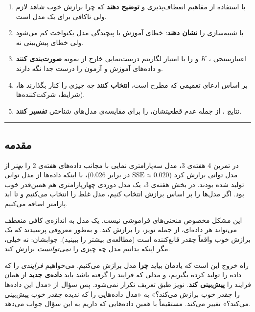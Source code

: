 \begin{enumerate}
\def\labelenumi{\arabic{enumi}.}
\tightlist
\item
  با استفاده از مفاهیم انعطاف‌پذیری و  \textbf{توضیح
  دهند} که چرا برازش خوب شاهد لازم ولی ناکافی برای یک مدل است.
\item
  با شبیه‌سازی  را \textbf{نشان دهند}: خطای آموزش با
  پیچیدگی مدل یکنواخت کم می‌شود ولی خطای پیش‌بینی نه.
\item
  اعتبارسنجی ، \(K\) و  را با
  امتیاز لگاریتم درست‌نمایی خارج از نمونه \textbf{صورت‌بندی کنند} و
  داده‌های آموزش و آزمون را درست جدا نگه دارند.
\item
  بر اساس ادعای تعمیمی که مطرح است، \textbf{انتخاب کنند} چه چیزی را کنار
  بگذارند ها، شرایط، شرکت‌کننده‌ها).
\item
  نتایج ، از جمله عدم قطعیتشان، را برای مقایسه‌ی
  مدل‌های شناختی \textbf{تفسیر کنند}.
\end{enumerate}

\begin{center}\rule{0.5\linewidth}{0.5pt}\end{center}

\subsection{مقدمه}

در تمرین 4 هفته‌ی 3، مدل سه‌پارامتری نمایی با مجانب داده‌های هفته‌ی 2 را
\emph{بهتر} از مدل توانی برازش کرد (\(\mathrm{SSE} \approx 0.020\) در
برابر \(0.026\))، با اینکه داده‌ها از مدل توانی تولید شده بودند. در بخش
 هفته‌ی 3، یک مدل دوردی چهارپارامتری هم همین‌قدر خوب بود. اگر مدل‌ها
را بر اساس برازش انتخاب کنیم، مدل غلط را انتخاب می‌کنیم و تا ابد پارامتر
اضافه می‌کنیم.

این مشکل مخصوص منحنی‌های فراموشی نیست. یک مدل به اندازه‌ی کافی منعطف
می‌تواند هر داده‌ای، از جمله نویز، را برازش کند.  و
 به‌طور معروفی پرسیدند که یک برازش خوب واقعاً چقدر قانع‌کننده
است (مطالعه‌ی بیشتر را ببینید). جوابشان: نه خیلی، مگر اینکه بدانیم مدل چه
چیزی را \emph{نمی‌توانست} برازش کند.

راه خروج این است که یادمان بیاید \textbf{چرا} مدل برازش می‌کنیم. می‌خواهیم
\emph{فرایندی} را که داده را تولید کرده بگیریم، و مدلی که فرایند را
گرفته باشد باید \textbf{داده‌ی جدید} از همان فرایند را \textbf{پیش‌بینی
کند}. نویز طبق تعریف تکرار نمی‌شود. پس سؤال از «مدل این داده‌ها را چقدر
خوب برازش می‌کند؟» به «مدل داده‌هایی را که ندیده چقدر خوب پیش‌بینی می‌کند؟»
تغییر می‌کند.  مستقیماً با همین داده‌هایی که داریم به
این سؤال جواب می‌دهد.

